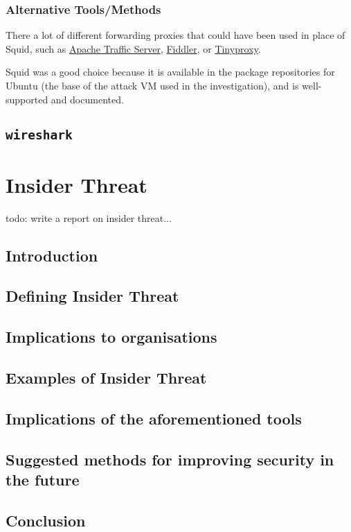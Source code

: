 \documentclass[12pt]{report}
\begin{document}
\subsection*{Alternative Tools/Methods}
There a lot of different forwarding proxies that could have been used in place of Squid, such as \href{https://docs.trafficserver.apache.org/en/5.3.x/admin/forward-proxy.en.html}{Apache Traffic Server}, \href{https://www.telerik.com/fiddler}{Fiddler}, or \href{https://tinyproxy.github.io/}{Tinyproxy}.

Squid was a good choice because it is available in the package repositories for Ubuntu (the base of the attack VM used in the investigation), and is well-supported and documented.

\section{\texttt{wireshark}}


\pagebreak
\chapter{Insider Threat}
todo: write a report on insider threat...
\section{Introduction}
\section{Defining Insider Threat}
\section{Implications to organisations}
\section{Examples of Insider Threat}
\section{Implications of the aforementioned tools}
\section{Suggested methods for improving security in the future}
\section{Conclusion}
\end{document}
